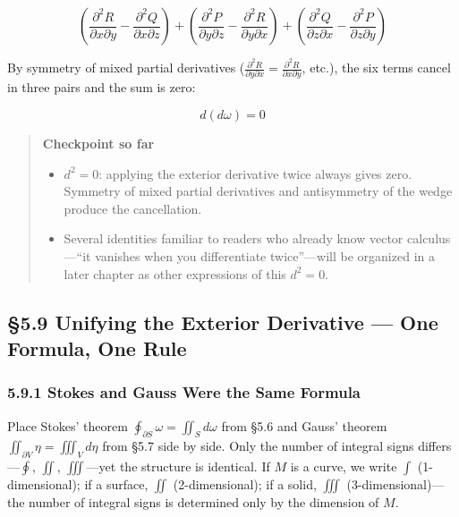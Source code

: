 \documentclass[a4paper,12pt,openany]{book}
\begin{document}
\[\left(\frac{\partial^2 R}{\partial x \partial y} - \frac{\partial^2 Q}{\partial x \partial z}\right) + \left(\frac{\partial^2 P}{\partial y \partial z} - \frac{\partial^2 R}{\partial y \partial x}\right) + \left(\frac{\partial^2 Q}{\partial z \partial x} - \frac{\partial^2 P}{\partial z \partial y}\right)\]

By symmetry of mixed partial derivatives
(\(\frac{\partial^2 R}{\partial y \partial x}=\frac{\partial^2 R}{\partial x \partial y}\),
etc.), the six terms cancel in three pairs and the sum is zero:

\[d(d\omega) = 0\]

\begin{quote}
\textbf{Checkpoint so far}

\begin{itemize}
\item
  \(d^2 = 0\): applying the exterior derivative twice always gives zero.
  Symmetry of mixed partial derivatives and antisymmetry of the wedge
  produce the cancellation.
\item
  Several identities familiar to readers who already know vector
  calculus—``it vanishes when you differentiate twice''—will be
  organized in a later chapter as other expressions of this \(d^2=0\).
\end{itemize}
\end{quote}

\par\vspace{0.35em}\par

\hypertarget{unifying-the-exterior-derivative-one-formula-one-rule}{%
\subsection{§5.9 Unifying the Exterior Derivative — One Formula, One
Rule}\label{unifying-the-exterior-derivative-one-formula-one-rule}}

\hypertarget{stokes-and-gauss-were-the-same-formula}{%
\subsubsection{5.9.1 Stokes and Gauss Were the Same
Formula}\label{stokes-and-gauss-were-the-same-formula}}

Place Stokes' theorem \(\oint_{\partial S}\omega = \iint_S d\omega\)
from §5.6 and Gauss' theorem \(\iint_{\partial V}\eta = \iiint_V d\eta\)
from §5.7 side by side. Only the number of integral signs
differs—\(\oint\), \(\iint\), \(\iiint\)—yet the structure is
identical. If \(M\) is a curve, we write \(\int\) (1-dimensional); if a
surface, \(\iint\) (2-dimensional); if a solid, \(\iiint\)
(3-dimensional)—the number of integral signs is determined only by the
dimension of \(M\).
\end{document}
